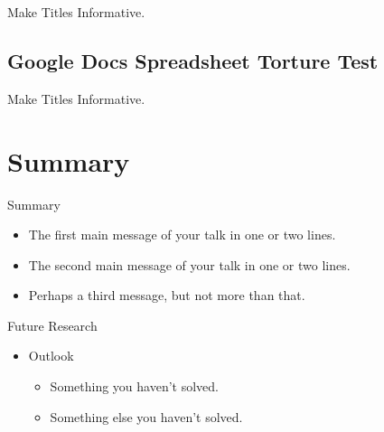 \documentclass{beamer}
\begin{document}
\begin{frame}{Make Titles Informative.}
\end{frame}

\subsection[GDocs Spreadsheet Testing]{Google Docs Spreadsheet Torture Test}

\begin{frame}{Make Titles Informative.}
\end{frame}

\section*{Summary}

\begin{frame}{Summary}

\begin{itemize}
  \item The \alert{first main message} of your talk in one or two lines.
  \item The \alert{second main message} of your talk in one or two lines.
  \item Perhaps a \alert{third message}, but not more than that.
\end{itemize}

\end{frame}

\begin{frame}{Future Research}
\begin{itemize}
  \item Outlook
  \begin{itemize}
    \item Something you haven't solved.
    \item Something else you haven't solved.
  \end{itemize}
  \end{itemize}
\end{frame}
\end{document}
